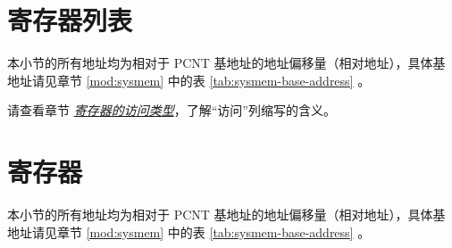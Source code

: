 \documentclass[main\_\_CN.tex]{subfiles}
\begin{document}


\hypertarget{pcnt-reg-summ}{}
\section{寄存器列表}
\label{sec:pcnt-reg-summ}

本小节的所有地址均为相对于 PCNT 基地址的地址偏移量（相对地址），具体基地址请见章节 \ref{mod:sysmem} \textit{} 中的表 \ref{tab:sysmem-base-address} \textit{}。

请查看章节 \hyperref[glossary-access-types]{\textit{寄存器的访问类型}}，了解“访问”列缩写的含义。






\newpage
\section{寄存器}

本小节的所有地址均为相对于 PCNT 基地址的地址偏移量（相对地址），具体基地址请见章节 \ref{mod:sysmem} \textit{} 中的表 \ref{tab:sysmem-base-address} \textit{}。


\end{document}
